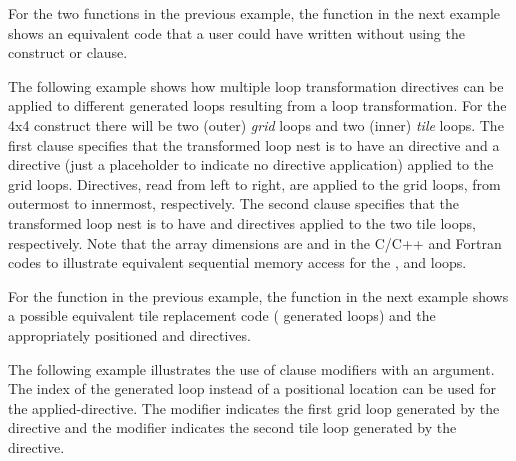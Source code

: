 
For the two functions in the previous example,
the  function in the next example shows an equivalent
code that a user could have written without using the  construct
or  clause.



The following example shows how multiple loop transformation directives
can be applied to different generated loops resulting from a loop transformation.
For the 4x4  construct there will be two (outer) \emph{grid} loops
and two (inner) \emph{tile} loops. The first  clause specifies
that the transformed loop nest is to have an  directive and
a  directive (just a placeholder to indicate no directive
application) applied to the grid loops. Directives, read from left to right,
are applied to the grid loops, from outermost to innermost, respectively. The
second  clause specifies that the transformed loop nest is to have
 and  directives applied to the two tile
loops, respectively. Note that the  array dimensions are
 and  in the C/C++ and Fortran
codes to illustrate equivalent sequential memory access for the ,
 and  loops.


\pagebreak
{}

For the function in the previous example,
the  function in the next example shows a possible
equivalent tile replacement code ( generated loops) and the
appropriately positioned  and  directives.

\pagebreak
{}



The following example illustrates the use of  clause 
modifiers with an argument. The index of the generated loop instead of
a positional location can be used for the applied-directive. 
The  modifier indicates the first grid loop 
generated by the  directive
and the  modifier indicates the second tile loop
generated by the  directive.

